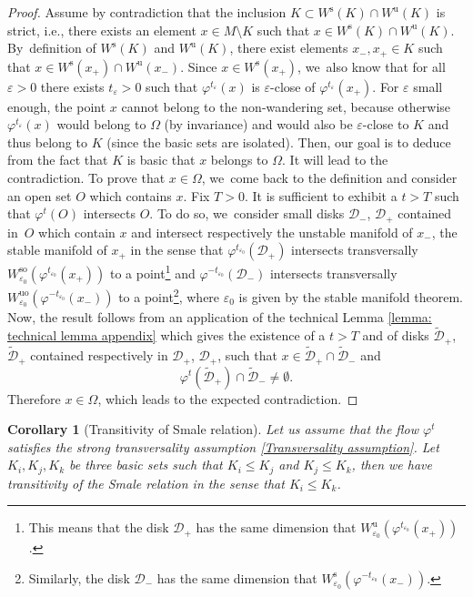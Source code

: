 \documentclass[11pt]{article}
\newcommand{\ie}{i.e.,\xspace}
\newcommand{\rs}{\mathrm{s}}
\newcommand{\rso}{\mathrm{so}}
\newcommand{\ru}{\mathrm{u}}
\newcommand{\ruo}{\mathrm{uo}}
\theoremstyle{definition}
\theoremstyle{plain}
\newtheorem{corollary}[definition]{Corollary}
\newcommand{\D}{\mathcal{D}}
\begin{document}
\begin{appendix}
\begin{proof}
Assume by contradiction that the inclusion $K \subset W^\rs (K) \cap W^\ru (K)$ is strict, \ie there exists an element $x \in M \setminus K$ such that $x \in W^\rs (K) \cap W^\ru (K)$. By~definition of $W^\rs (K)$ and $W^\ru (K)$, there exist elements $x_-, x_+ \in K$ such that $x \in W^\rs (x_+) \cap W^\ru (x_-)$. Since $x \in W^\rs (x_{+})$, we~also know that for all $\varepsilon > 0$ there exists $t_{\varepsilon} > 0$ such that $\varphi^{t_{\varepsilon}} (x)$ is $\varepsilon$-close of $\varphi^{t_{\varepsilon}} (x_+)$. For $\varepsilon$ small enough, the point $x$ cannot belong to the non-wandering set, because otherwise $\varphi^{t_{\varepsilon}} (x)$ would belong to $\Omega$ (by invariance) and would also be $\varepsilon$-close to $K$ and thus belong to $K$ (since the basic sets are isolated). Then, our goal is to deduce from the fact that $K$ is basic that $x$ belongs to $\Omega$. It will lead to the contradiction. To prove that $x \in \Omega$, we~come back to the definition and consider an open set $O$ which contains $x$. Fix $T > 0$. It is sufficient to exhibit a $t > T$ such that $\varphi^t (O)$ intersects $O$. To do so, we~consider small disks $\D_{-}$, $\D_{+}$ contained in~$O$ which contain $x$ and intersect respectively the unstable manifold of $x_-$, the stable manifold of $x_+$ in the sense that $\varphi^{t_{\varepsilon_0}} (\D_+)$ intersects transversally $W_{\varepsilon_0}^{\rso} (\varphi^{t_{\varepsilon_0}} (x_+))$ to a point\footnote{This means that the disk $\D_+$ has the same dimension that $W_{\varepsilon_0}^\ru (\varphi^{t_{\varepsilon_0}} (x_+))$.} and $\varphi^{-t_{\varepsilon_0}} (\D_-)$ intersects transversally $W_{\varepsilon_0}^{\ruo} (\varphi^{-t_{\varepsilon_0}} (x_-))$ to a point\footnote{Similarly, the disk $\D_-$ has the same dimension that $W_{\varepsilon_0}^{\rs} (\varphi^{-t_{\varepsilon_0}} (x_-))$.}, where $\varepsilon_0$ is given by the stable manifold theorem. Now, the result follows from an application of the technical Lemma \ref{lemma: technical lemma appendix} which gives the existence of a $t > T$ and of disks $\widetilde{\D}_{+}$, $\widetilde{\D}_{+}$ contained respectively in $\D_{+}$, $\D_{+}$, such that $x \in \widetilde{\D}_+ \cap \widetilde{\D}_-$ and
\[
\varphi^t (\widetilde{\D}_{+}) \cap \widetilde{\D}_{-} \neq \emptyset.
\]
Therefore $x \in \Omega$, which leads to the expected contradiction.
\end{proof}

\begin{corollary}[Transitivity of Smale relation]\label{cor: transitivity of Smale relation}
Let us assume that the flow $\varphi^t$ satisfies the strong transversality assumption \eqref{Transversality assumption}. Let $K_i, K_j, K_k$ be three basic sets such that $K_i \leq K_j$ and $K_j \leq K_k$, then we have transitivity of the Smale relation in the sense that $K_i \leq K_k$.
\end{corollary}


\end{appendix}
\end{document}

